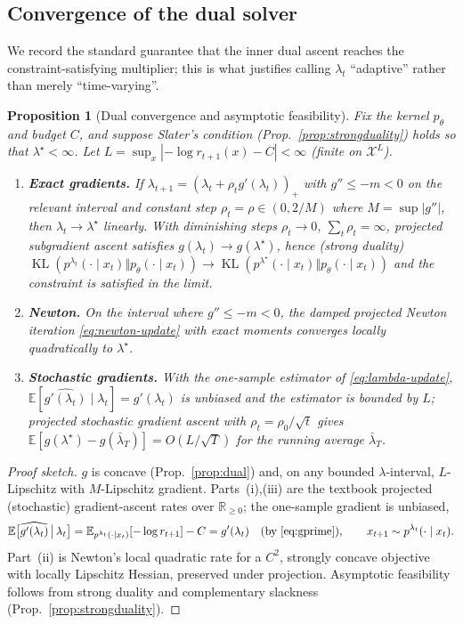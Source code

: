 \documentclass{article}
\newtheorem{proposition}{Proposition}
\DeclareMathOperator{\KL}{KL}
\newcommand{\E}{\mathbb{E}}
\newcommand{\R}{\mathbb{R}}
\newcommand{\X}{\mathcal{X}}
\newcommand{\lstar}{\lambda^{\star}}
\begin{document}
\subsection{Convergence of the dual solver}
We record the standard guarantee that the inner dual ascent reaches the constraint-satisfying multiplier; this is what justifies calling $\lambda_t$ ``adaptive'' rather than merely ``time-varying''.

\begin{proposition}[Dual convergence and asymptotic feasibility]
\label{prop:converge}
Fix the kernel $p_\theta$ and budget $C$, and suppose Slater's condition (Prop.~\ref{prop:strongduality}) holds so that $\lstar<\infty$. Let $L=\sup_x|{-}\log r_{t+1}(x)-C|<\infty$ (finite on $\X^L$).
\begin{enumerate}
\item[(i)] \textbf{Exact gradients.} If $\lambda_{t+1}=(\lambda_t+\rho_t g'(\lambda_t))_+$ with $g''\le-m<0$ on the relevant interval and constant step $\rho_t=\rho\in(0,2/M)$ where $M=\sup|g''|$, then $\lambda_t\to\lstar$ linearly. With diminishing steps $\rho_t\to0$, $\sum_t\rho_t=\infty$, projected subgradient ascent satisfies $g(\lambda_t)\to g(\lstar)$, hence (strong duality) $\KL(p^{\lambda_t}(\cdot\mid x_t)\Vert p_\theta(\cdot\mid x_t))\to\KL(p^{\lstar}(\cdot\mid x_t)\Vert p_\theta(\cdot\mid x_t))$ and the constraint is satisfied in the limit.
\item[(ii)] \textbf{Newton.} On the interval where $g''\le -m<0$, the damped projected Newton iteration \eqref{eq:newton-update} with exact moments converges locally quadratically to $\lstar$.
\item[(iii)] \textbf{Stochastic gradients.} With the one-sample estimator of \eqref{eq:lambda-update}, $\E[\widehat{g'(\lambda_t)}\mid\lambda_t]=g'(\lambda_t)$ is unbiased and the estimator is bounded by $L$; projected stochastic gradient ascent with $\rho_t=\rho_0/\sqrt{t}$ gives $\E[g(\lstar)-g(\bar\lambda_T)]=O(L/\sqrt{T})$ for the running average $\bar\lambda_T$.
\end{enumerate}
\end{proposition}
\begin{proof}[Proof sketch]
$g$ is concave (Prop.~\ref{prop:dual}) and, on any bounded $\lambda$-interval, $L$-Lipschitz with $M$-Lipschitz gradient. Parts~(i),(iii) are the textbook projected (stochastic) gradient-ascent rates over $\R_{\ge0}$; the one-sample gradient is unbiased,
\begin{equation*}
\E\big[\widehat{g'(\lambda_t)}\,\big|\,\lambda_t\big]
=\E_{p^{\lambda_t}(\cdot\mid x_t)}[-\log r_{t+1}]-C
=g'(\lambda_t)\quad(\text{by }\eqref{eq:gprime}),\qquad x_{t+1}\sim p^{\lambda_t}(\cdot\mid x_t).
\end{equation*}
Part~(ii) is Newton's local quadratic rate for a $C^2$, strongly concave objective with locally Lipschitz Hessian, preserved under projection. Asymptotic feasibility follows from strong duality and complementary slackness (Prop.~\ref{prop:strongduality}).
\end{proof}
\end{document}
